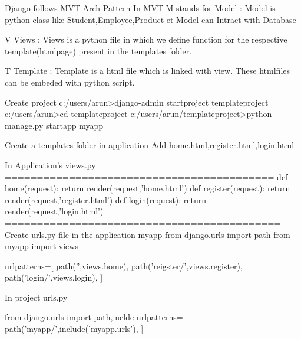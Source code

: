 Django follows MVT Arch-Pattern
In MVT
M stands for Model :
	Model is python class like Student,Employee,Product et		Model can Intract with Database

V Views :
	Views is a python file in which
	we define function for the 	respective template(htmlpage) present in the templates folder. 

T Template : Template is a html file which is linked with view.
	     These htmlfiles can be embeded with python script.


Create project
	c:/users/arun>django-admin startproject templateproject
	c:/users/arun>cd templateproject
	c:/users/arun/templateproject>python manage.py startapp myapp
	
	Create a templates folder in application
	Add home.html,register.html,login.html
	
	In Application's views.py
	==========================================
	def home(request):
		return render(request,'home.html')
	def register(request):
		return render(request,'register.html')
	def login(request):
		return render(request,'login.html')
	===========================================
	Create urls.py file in the application myapp
	from django.urls import path
	from myapp import views
	
	urlpatterns=[
		path('',views.home),
		path('reigster/',views.register),
		path('login/',views.login),
	]
	
	In project urls.py
	
	from django.urls import path,inclde
	urlpatterns=[
		path('myapp/',include('myapp.urls'),
	]
	
	
	
	
	 
	
	
	
	
	
	
	
	
	
	
	
		